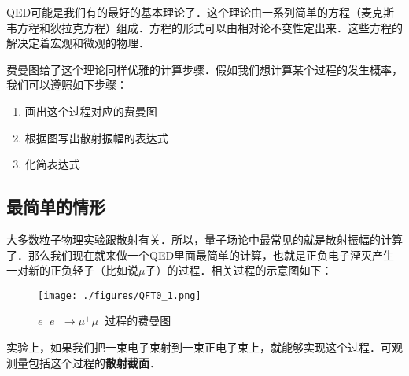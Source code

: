 

QED可能是我们有的最好的基本理论了．这个理论由一系列简单的方程（麦克斯韦方程和狄拉克方程）组成．方程的形式可以由相对论不变性定出来．这些方程的解决定着宏观和微观的物理．

费曼图给了这个理论同样优雅的计算步骤．假如我们想计算某个过程的发生概率，我们可以遵照如下步骤：

\begin{enumerate}
\item 画出这个过程对应的费曼图
\item 根据图写出散射振幅的表达式
\item 化简表达式
\end{enumerate}

\subsection{最简单的情形}
大多数粒子物理实验跟散射有关．所以，量子场论中最常见的就是散射振幅的计算了．那么我们现在就来做一个QED里面最简单的计算，也就是正负电子湮灭产生一对新的正负轻子（比如说$\mu$子）的过程．相关过程的示意图如下：

\begin{figure}[ht]
\centering
\texttt{[image: ./figures/QFT0\_1.png]}
\caption{$e^+e^-\rightarrow\mu^+\mu^-$过程的费曼图} \label{QFT0_fig1}
\end{figure}

实验上，如果我们把一束电子束射到一束正电子束上，就能够实现这个过程．可观测量包括这个过程的\textbf{散射截面}．




